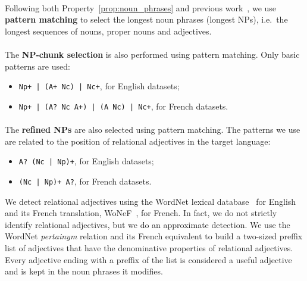       \paragraph{}
      Following both Property~\ref{prop:noun_phrases} and previous
      work~\cite{hassan2010conundrums}, we use \textbf{pattern matching} to
      select the longest noun phrases (longest NPs), i.e.~the longest sequences
      of nouns, proper nouns and adjectives.

      \paragraph{}
      The \textbf{NP-chunk selection} is also performed using pattern matching.
      Only basic patterns are used:
      \begin{itemize}
        \item{\verb:Np+ | (A+ Nc) | Nc+:, for English datasets;}
        \item{\verb:Np+ | (A? Nc A+) | (A Nc) | Nc+:, for French datasets.}
      \end{itemize}

      \paragraph{}
      The \textbf{refined NPs} are also selected using pattern matching. The
      patterns we use are related to the position of relational adjectives in
      the target language:
      \begin{itemize}
        \item{\verb:A? (Nc | Np)+:, for English datasets;}
        \item{\verb:(Nc | Np)+ A?:, for French datasets.}
      \end{itemize}
      We detect relational adjectives using the WordNet lexical
      database~\cite{miller1995wordnet} for English and its French translation,
      WoNeF~\cite{pradet2013wonef}, for French. In fact, we do not strictly
      identify relational adjectives, but we do an approximate detection. We use
      the WordNet \textit{pertainym} relation and its French equivalent to build
      a two-sized preffix list of adjectives that have the denominative
      properties of relational adjectives. Every adjective ending with a preffix
      of the list is considered a useful adjective and is kept in the noun
      phrases it modifies.

